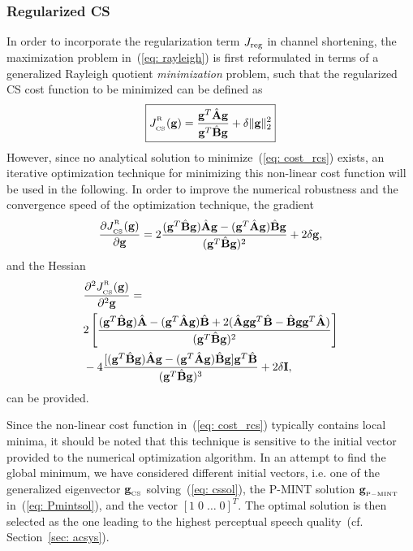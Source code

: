 \documentclass[10pt]{IEEEtran}
\begin{document}
\subsubsection*{Regularized CS}
In order to incorporate the regularization term $J_{\rm reg}$ in channel shortening, the maximization problem in~(\ref{eq: rayleigh}) is first reformulated in terms of a generalized Rayleigh quotient \emph{minimization} problem, such that the regularized CS cost function to be minimized can be defined as
\begin{equation}
\label{eq: cost_rcs}
\boxed{J_{{}_{\rm CS}}^{^{_{\rm R}}}(\mathbf{g})= \frac{\mathbf{g}^T {\hat{\mathbf{A}}} \mathbf{g}}{\mathbf{g}^T {\hat{\mathbf{B}}} \mathbf{g}} + \delta \|\mathbf{g} \|_2^2}
\end{equation}
However, since no analytical solution to minimize~(\ref{eq: cost_rcs}) exists, an iterative optimization technique for minimizing this non-linear cost function will be used in the following.
In order to improve the numerical robustness and the convergence speed of the optimization technique, the gradient
\begin{equation}
\frac{\partial J_{{}_{\rm CS}}^{^{_{\rm R}}}(\mathbf{g})}{\partial \mathbf{g}} = 2 \frac{(\mathbf{g}^T \hat{\mathbf{B}} \mathbf{g})\hat{\mathbf{A}}\mathbf{g} - (\mathbf{g}^T \hat{\mathbf{A}} \mathbf{g})\hat{\mathbf{B}}\mathbf{g} }{(\mathbf{g}^T \hat{\mathbf{B}} \mathbf{g})^2} + 2 \delta \mathbf{g},
\end{equation}
and the Hessian
\begin{equation}
\begin{split}
& \frac{\partial ^2 J_{{}_{\rm CS}}^{^{_{\rm R}}}(\mathbf{g})}{\partial^2 \mathbf{g}}  = \\
& 2 \left[ \frac{(\mathbf{g}^T \hat{\mathbf{B}} \mathbf{g}) \hat{\mathbf{A}} - (\mathbf{g}^T \hat{\mathbf{A}} \mathbf{g}) \hat{\mathbf{B}} + 2 ( \hat{\mathbf{A}} \mathbf{g} \mathbf{g}^T \hat{\mathbf{B}} - \hat{\mathbf{B}} \mathbf{g} \mathbf{g}^T \hat{\mathbf{A}})}{(\mathbf{g}^T \hat{\mathbf{B}}\mathbf{g})^2} \right] \\
& -  4 \frac{[(\mathbf{g}^T\hat{\mathbf{B}}\mathbf{g})\hat{\mathbf{A}}\mathbf{g} - (\mathbf{g}^T\hat{\mathbf{A}}\mathbf{g})\hat{\mathbf{B}}\mathbf{g}] \mathbf{g}^T \hat{\mathbf{B}}}{(\mathbf{g}^T\hat{\mathbf{B}}\mathbf{g})^3} + 2 \delta \mathbf{I},
\end{split}
\end{equation}
can be provided.

Since the non-linear cost function in~(\ref{eq: cost_rcs}) typically contains local minima, it should be noted that this technique is sensitive to the initial vector provided to the numerical optimization algorithm.
In an attempt to find the global minimum, we have considered different initial vectors, i.e. one of the generalized eigenvector $\mathbf{g}_{_{\rm CS}}$ solving~(\ref{eq: cssol}), the P-MINT solution $\mathbf{g}_{{}_{\rm P-MINT}}$ in~(\ref{eq: Pmintsol}), and the vector $[1 \; 0 \; \ldots \; 0]^T$.
The optimal solution is then selected as the one leading to the highest perceptual speech quality~(cf. Section~\ref{sec: acsys}).
\end{document}
